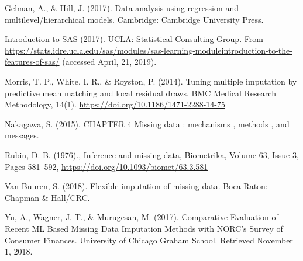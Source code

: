 \documentclass[12pt,oneside]{chicagocapstone}
\begin{document}
Gelman, A., \& Hill, J. (2017). Data analysis using regression and
multilevel/hierarchical models. Cambridge: Cambridge University Press.

Introduction to SAS (2017). UCLA: Statistical Consulting Group. From
\url{https://stats.idre.ucla.edu/sas/modules/sas-learning-moduleintroduction-to-the-features-of-sas/}
(accessed April, 21, 2019).

Morris, T. P., White, I. R., \& Royston, P. (2014). Tuning multiple
imputation by predictive mean matching and local residual draws. BMC
Medical Research Methodology, 14(1).
\url{https://doi.org/10.1186/1471-2288-14-75}

Nakagawa, S. (2015). CHAPTER 4 Missing data : mechanisms , methods , and
messages.

Rubin, D. B. (1976)., Inference and missing data, Biometrika, Volume 63,
Issue 3, Pages 581--592, \url{https://doi.org/10.1093/biomet/63.3.581}

Van Buuren, S. (2018). Flexible imputation of missing data. Boca Raton:
Chapman \& Hall/CRC.

Yu, A., Wagner, J. T., \& Murugesan, M. (2017). Comparative Evaluation
of Recent ML Based Missing Data Imputation Methods with NORC's Survey of
Consumer Finances. University of Chicago Graham School. Retrieved
November 1, 2018.


\end{document}
